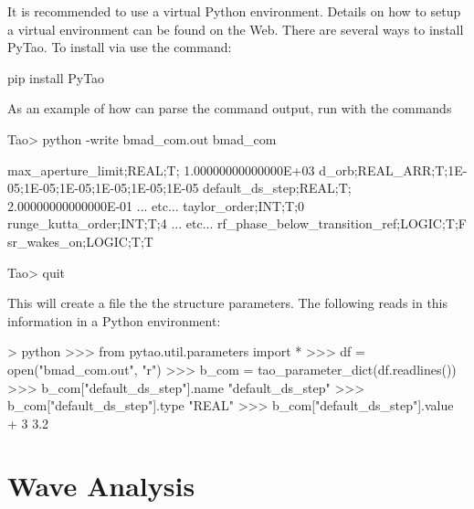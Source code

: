 \documentclass{hitec}     %
\newcommand{\Section}[1]{\section{#1}\vspace*{-1ex}}
\begin{document}
It is recommended to use a virtual Python environment. Details on how to setup a virtual environment can
be found on the Web. There are several ways to install PyTao. To install via  use the command:
\begin{code}
  pip install PyTao
\end{code}

As an example of how  can parse the  command output, run \tao with the commands
\begin{code}
Tao> python -write bmad_com.out bmad_com

max_aperture_limit;REAL;T;  1.00000000000000E+03
d_orb;REAL_ARR;T;1E-05;1E-05;1E-05;1E-05;1E-05;1E-05
default_ds_step;REAL;T;  2.00000000000000E-01
... etc...
taylor_order;INT;T;0
runge_kutta_order;INT;T;4
... etc...
rf_phase_below_transition_ref;LOGIC;T;F
sr_wakes_on;LOGIC;T;T

Tao> quit
\end{code}
This will create a file  the the  structure parameters.
The following reads in this information in a Python environment:
\begin{code}
> python
>>> from pytao.util.parameters import *
>>> df = open("bmad_com.out", "r")
>>> b_com = tao_parameter_dict(df.readlines())
>>> b_com["default_ds_step"].name
"default_ds_step"
>>> b_com["default_ds_step"].type
"REAL"
>>> b_com["default_ds_step"].value + 3
3.2
\end{code}

\newpage

\Section{Wave Analysis}
\label{s:wave.anal}
\end{document}
